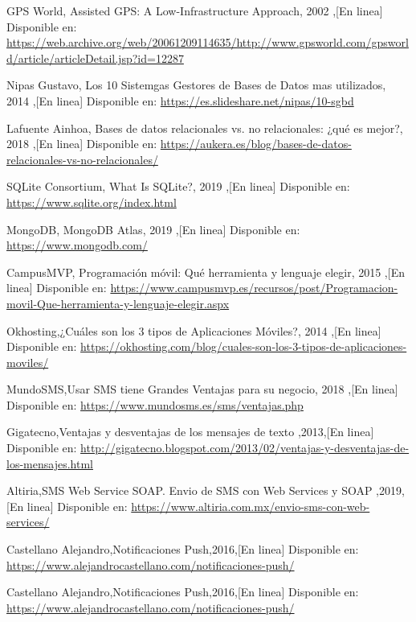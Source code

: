 \begin{thebibliography}{50}
	 GPS World, Assisted GPS: A Low-Infrastructure Approach, 2002 ,[En linea] Disponible en: \url{https://web.archive.org/web/20061209114635/http://www.gpsworld.com/gpsworld/article/articleDetail.jsp?id=12287}	

	 Nipas Gustavo, Los 10 Sistemgas Gestores de Bases de Datos mas utilizados, 2014 ,[En linea] Disponible en: \url{https://es.slideshare.net/nipas/10-sgbd}

	 Lafuente Ainhoa, Bases de datos relacionales vs. no relacionales: ¿qué es mejor?, 2018 ,[En linea] Disponible en: \url{https://aukera.es/blog/bases-de-datos-relacionales-vs-no-relacionales/}

	 SQLite Consortium, What Is SQLite?, 2019 ,[En linea] Disponible en: \url{https://www.sqlite.org/index.html}

	 MongoDB, MongoDB Atlas, 2019 ,[En linea] Disponible en: \url{https://www.mongodb.com/}

	 CampusMVP, Programación móvil: Qué herramienta y lenguaje elegir, 2015 ,[En linea] Disponible en: \url{https://www.campusmvp.es/recursos/post/Programacion-movil-Que-herramienta-y-lenguaje-elegir.aspx}

	 Okhosting,¿Cuáles son los 3 tipos de Aplicaciones Móviles?, 2014 ,[En linea] Disponible en: \url{https://okhosting.com/blog/cuales-son-los-3-tipos-de-aplicaciones-moviles/}

	 MundoSMS,Usar SMS tiene Grandes Ventajas para su negocio, 2018 ,[En linea] Disponible en: \url{https://www.mundosms.es/sms/ventajas.php}

	 Gigatecno,Ventajas y desventajas de los mensajes de texto ,2013,[En linea] Disponible en: \url{http://gigatecno.blogspot.com/2013/02/ventajas-y-desventajas-de-los-mensajes.html}

	 Altiria,SMS Web Service SOAP. Envio de SMS con Web Services y SOAP ,2019,[En linea] Disponible en: \url{https://www.altiria.com.mx/envio-sms-con-web-services/}

	 Castellano Alejandro,Notificaciones Push,2016,[En linea] Disponible en: \url{https://www.alejandrocastellano.com/notificaciones-push/}

	 Castellano Alejandro,Notificaciones Push,2016,[En linea] Disponible en: \url{https://www.alejandrocastellano.com/notificaciones-push/}
	

\end{thebibliography}
